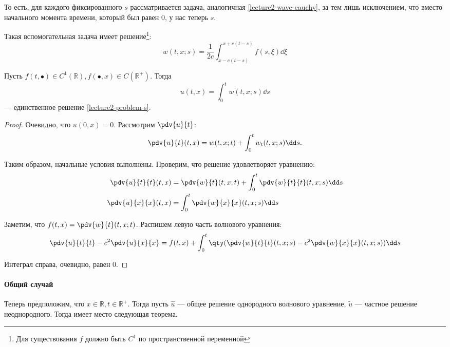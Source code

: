 То есть, для каждого фиксированного $s$ рассматривается задача, аналогичная \eqref{lecture2-wave-cauchy}, за тем лишь исключением, что вместо начального момента времени, который был равен $0$, у нас теперь $s$.

Такая вспомогательная задача имеет решение\footnote{Для существования $f$ должно быть $C^1$ по пространственной переменной}:
%
\begin{equation*}
  w(t, x; s) = \frac{1}{2c} \int_{x-c(t-s)}^{x+c(t-s)} f(s, \xi) \dd \xi
\end{equation*}

\begin{thm}
  Пусть $f(t, \bullet) \in C^1(\mathbb{R}), f(\bullet, x) \in C(\mathbb{R}^+)$. Тогда
  \begin{equation*}
    u(t, x) = \int_0^t w(t, x; s) \dd s
  \end{equation*}
  --- единственное решение \eqref{lecture2-problem-s}.
\end{thm}

\begin{proof}
  Очевидно, что $u(0, x) = 0$. Рассмотрим $\pdv{u}{t}$:
  \begin{equation*}
    \pdv{u}{t} (t, x) = w(t, x; t) + \int_0^t w_t(t, x; s) \dd s.
  \end{equation*}
  
  Таким образом, начальные условия выполнены. Проверим, что решение удовлетворяет уравнению:
  \begin{align*}
    \pdv{u}{t}{t} (t, x) &= \pdv{w}{t} (t, x; t) + \int_0^t \pdv{w}{t}{t} (t, x; s) \dd s \\
    \pdv{u}{x}{x} (t, x) &= \int_0^t \pdv{w}{x}{x} (t, x; s) \dd s
  \end{align*}
  
  Заметим, что $f(t, x) = \pdv{w}{t} (t, x; t)$. Распишем левую часть волнового уравнения:
  \begin{equation*}
    \pdv{u}{t}{t} - c^2 \pdv{u}{x}{x} = f(t, x) + \int_0^t \qty(\pdv{w}{t}{t} (t, x; s) - c^2 \pdv{w}{x}{x} (t, x; s)) \dd s
  \end{equation*}
  
  Интеграл справа, очевидно, равен $0$.
\end{proof}

\paragraph{Общий случай}

Теперь предположим, что $x \in \mathbb{R}, t \in \mathbb{R}^+$. Тогда пусть $\hat{u}$ --- общее решение однородного волнового уравнение, $\tilde{u}$ --- частное решение неоднородного. Тогда имеет место следующая теорема.

